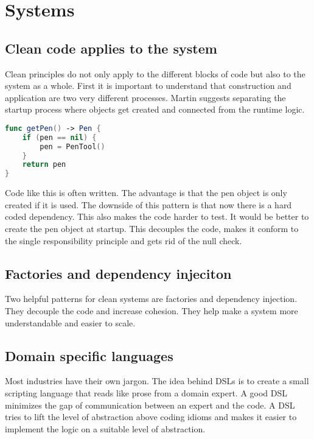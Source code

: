 \section{Systems}

\subsection{Clean code applies to the system}
Clean principles do not only apply to the different blocks of code but also to the system as a whole. First it is important to understand that construction and application are two very different processes. Martin suggests separating the startup process where objects get created and connected from the runtime logic.

\begin{lstlisting}[language=Swift, caption={Lazy initialisation}]
func getPen() -> Pen {
    if (pen == nil) {
        pen = PenTool()
    }
    return pen
}
\end{lstlisting}

Code like this is often written. The advantage is that the pen object is only created if it is used. The downside of this pattern is that now there is a hard coded dependency. This also makes the code harder to test. It would be better to create the pen object at startup. This decouples the code, makes it conform to the single responsibility principle and gets rid of the null check.

\subsection{Factories and dependency injeciton}
Two helpful patterns for clean systems are factories and dependency injection. They decouple the code and increase cohesion. They help make a system more understandable and easier to scale.

\subsection{Domain specific languages}
Most industries have their own jargon. The idea behind DSLs is to create a small scripting language that reads like prose from a domain expert. A good DSL minimizes the gap of communication between an expert and the code. A DSL tries to lift the level of abstraction above coding idioms and makes it easier to implement the logic on a suitable level of abstraction.
